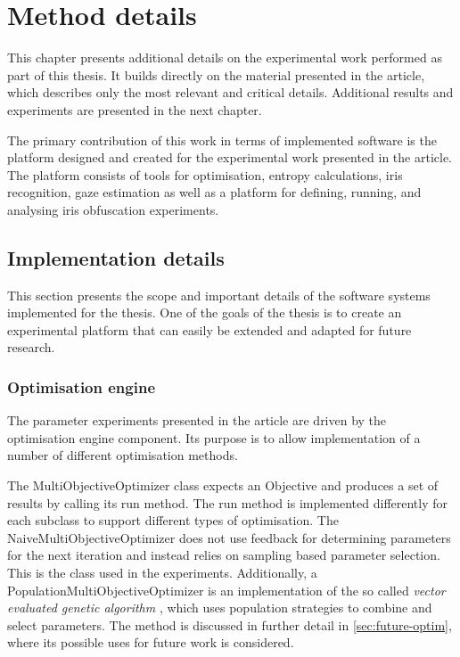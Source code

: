 \chapter{Method details}
This chapter presents additional details on the experimental work performed as part of this thesis. It builds directly on the material presented in the article, which describes only the most relevant and critical details. Additional results and experiments are presented in the next chapter.

The primary contribution of this work in terms of implemented software is the platform designed and created for the experimental work presented in the article. The platform consists of tools for optimisation, entropy calculations, iris recognition, gaze estimation as well as a platform for defining, running, and analysing iris obfuscation experiments. 


\section{Implementation details}
This section presents the scope and important details of the software systems implemented for the thesis. One of the goals of the thesis is to create an experimental platform that can easily be extended and adapted for future research.

\subsection{Optimisation engine}\label{sec:detail-opt}
The parameter experiments presented in the article are driven by the optimisation engine component. Its purpose is to allow implementation of a number of different optimisation methods.

The MultiObjectiveOptimizer class expects an Objective and produces a set of results by calling its run method. The run method is implemented differently for each subclass to support different types of optimisation. The NaiveMultiObjectiveOptimizer does not use feedback for determining parameters for the next iteration and instead relies on sampling based parameter selection. This is the class used in the experiments. Additionally, a PopulationMultiObjectiveOptimizer is an implementation of the so called \textit{vector evaluated genetic algorithm} \parencite{kochenderfer2019algorithms}, which uses population strategies to combine and select parameters. The method is discussed in further detail in \cref{sec:future-optim}, where its possible uses for future work is considered.

